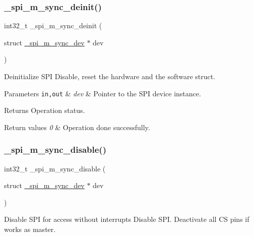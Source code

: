 \subsubsection{\texorpdfstring{\+\_\+spi\+\_\+m\+\_\+sync\+\_\+deinit()}{\_spi\_m\_sync\_deinit()}}
{\footnotesize\ttfamily int32\+\_\+t \+\_\+spi\+\_\+m\+\_\+sync\+\_\+deinit (\begin{DoxyParamCaption}\item[{struct \hyperlink{group__hpl__spi_ga7674622aeda62f2981f106e2d8221a5e}{\+\_\+spi\+\_\+m\+\_\+sync\+\_\+dev} $\ast$}]{dev }\end{DoxyParamCaption})}



Deinitialize S\+PI Disable, reset the hardware and the software struct. 


\begin{DoxyParams}[1]{Parameters}
\mbox{\tt in,out}  & {\em dev} & Pointer to the S\+PI device instance. \\
\hline
\end{DoxyParams}
\begin{DoxyReturn}{Returns}
Operation status. 
\end{DoxyReturn}

\begin{DoxyRetVals}{Return values}
{\em 0} & Operation done successfully. \\
\hline
\end{DoxyRetVals}
\mbox{\label{group__hpl__spi_ga1f98d26555a08dae45c7d80da8a6b1e9}} 
\subsubsection{\texorpdfstring{\+\_\+spi\+\_\+m\+\_\+sync\+\_\+disable()}{\_spi\_m\_sync\_disable()}}
{\footnotesize\ttfamily int32\+\_\+t \+\_\+spi\+\_\+m\+\_\+sync\+\_\+disable (\begin{DoxyParamCaption}\item[{struct \hyperlink{group__hpl__spi_ga7674622aeda62f2981f106e2d8221a5e}{\+\_\+spi\+\_\+m\+\_\+sync\+\_\+dev} $\ast$}]{dev }\end{DoxyParamCaption})}



Disable S\+PI for access without interrupts Disable S\+PI. Deactivate all CS pins if works as master. 


